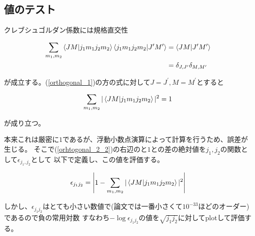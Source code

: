 \subsection{値のテスト}

クレブシュゴルダン係数には規格直交性

\begin{align}\label{orthogonal_1}
    \sum_{m_1,m_2}\bra{JM}\ket{j_1 m_1 j_2 m_2}\bra{j_1 m_1 j_2 m_2}\ket{J^{\prime} M^{\prime}} 
    &= \bra{JM}\ket{J^{\prime} M^{\prime}} \\ \notag
    &= \delta_{J,J^{\prime}} \delta_{M,M^{\prime}}
\end{align}

が成立する。(\ref{orthogonal_1})の方の式に対して$J = J^{\prime}, M = M^{\prime}$とすると

\begin{align}\label{orhtogonal_2_2}
    \sum_{m_1,m_2} |\bra{JM}\ket{j_1 m_1 j_2 m_2}|^2 = 1
\end{align}

が成り立つ。


本来これは厳密に$1$であるが、浮動小数点演算によって計算を行うため、誤差が生じる。
そこで(\ref{orhtogonal_2_2})の右辺のと$1$との差の絶対値を$j_1,j_2$の関数として$\epsilon_{j_1,j_2}$として
以下で定義し、この値を評価する。

\begin{align}\label{error_cg}
    \epsilon_{j_1 j_2} = \left| 1 - \sum_{m_1,m_2}|\bra{J M}\ket{j_1 m_1 j_2 m_2}|^2 \right|
\end{align}

しかし、$\epsilon_{j_1 j_2}$はとても小さい数値で(論文では一番小さくて$10^{-33}$ほどのオーダー)であるので負の常用対数
すなわち$-\log \epsilon_{j_1 j_2}$の値を$\sqrt{j_1 j_2}$に対してplotして評価する。
